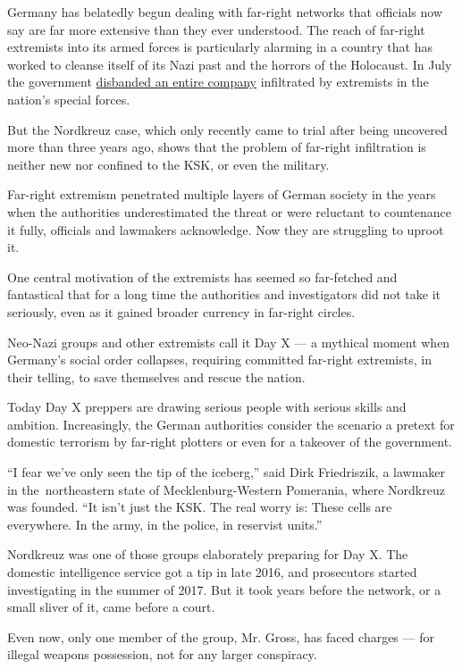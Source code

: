 Germany has belatedly begun dealing with far-right networks that
officials now say are far more extensive than they ever understood. The
reach of far-right extremists into its armed forces is particularly
alarming in a country that has worked to cleanse itself of its Nazi past
and the horrors of the Holocaust. In July the government
\href{https://www.nytimes3xbfgragh.onion/2020/07/01/world/europe/german-special-forces-far-right.html}{disbanded
an entire company} infiltrated by extremists in the nation's special
forces.

But the Nordkreuz case, which only recently came to trial after being
uncovered more than three years ago, shows that the problem of far-right
infiltration is neither new nor confined to the KSK, or even the
military.

Far-right extremism penetrated multiple layers of German society in the
years when the authorities underestimated the threat or were reluctant
to countenance it fully, officials and lawmakers acknowledge. Now they
are struggling to uproot it.

One central motivation of the extremists has seemed so far-fetched and
fantastical that for a long time the authorities and investigators did
not take it seriously, even as it gained broader currency in far-right
circles.

Neo-Nazi groups and other extremists call it Day X --- a mythical moment
when Germany's social order collapses, requiring committed far-right
extremists, in their telling, to save themselves and rescue the nation.

Today Day X preppers are drawing serious people with serious skills and
ambition. Increasingly, the German authorities consider the scenario a
pretext for domestic terrorism by far-right plotters or even for a
takeover of the government.

``I fear we've only seen the tip of the iceberg,'' said Dirk
Friedriszik, a lawmaker in the~northeastern state of Mecklenburg-Western
Pomerania, where Nordkreuz was founded. ``It isn't just the KSK. The
real worry is: These cells are everywhere. In the army, in the police,
in reservist units.''

Nordkreuz was one of those groups elaborately preparing for Day X. The
domestic intelligence service got a tip in late 2016, and prosecutors
started investigating in the summer of 2017. But it took years before
the network, or a small sliver of it, came before a court.

Even now, only one member of the group, Mr. Gross, has faced charges ---
for illegal weapons possession, not for any larger conspiracy.


